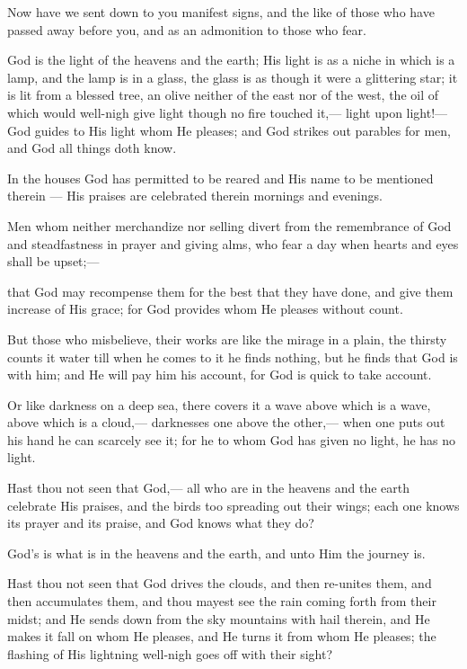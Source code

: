 \documentclass[fontsize=14pt, letterpaper, notitlepage, openany, DIV=12]{scrbook} %
\begin{document}
\noindent[24:34]
Now have we sent down to you manifest signs, and the like of those who have passed
away before you, and as an admonition to those who fear.

\noindent[24:35]
God is the light of the heavens and the earth; His light is as a niche in which is a lamp,
and the lamp is in a glass, the glass is as though it were a glittering star; it is lit from a blessed
tree, an olive neither of the east nor of the west, the oil of which would well-nigh give light
though no fire touched it,--- light upon light!--- God guides to His light whom He pleases; and
God strikes out parables for men, and God all things doth know.

\noindent[24:36]
In the houses God has permitted to be reared and His name to be mentioned therein ---
His praises are celebrated therein mornings and evenings.

\noindent[24:37]
Men whom neither merchandize nor selling divert from the remembrance of God and
steadfastness in prayer and giving alms, who fear a day when hearts and eyes shall be upset;---

\noindent[24:38]
that God may recompense them for the best that they have done, and give them increase
of His grace; for God provides whom He pleases without count.

\noindent[24:39]
But those who misbelieve, their works are like the mirage in a plain, the thirsty counts it
water till when he comes to it he finds nothing, but he finds that God is with him; and He will
pay him his account, for God is quick to take account.

\noindent[24:40]
Or like darkness on a deep sea, there covers it a wave above which is a wave, above
which is a cloud,--- darknesses one above the other,--- when one puts out his hand he can
scarcely see it; for he to whom God has given no light, he has no light.

\noindent[24:41]
Hast thou not seen that God,--- all who are in the heavens and the earth celebrate His
praises, and the birds too spreading out their wings; each one knows its prayer and its praise, and
God knows what they do?

\noindent[24:42]
God's is what is in the heavens and the earth, and unto Him the journey is.

\noindent[24:43]
Hast thou not seen that God drives the clouds, and then re-unites them, and then
accumulates them, and thou mayest see the rain coming forth from their midst; and He sends
down from the sky mountains with hail therein, and He makes it fall on whom He pleases, and
He turns it from whom He pleases; the flashing of His lightning well-nigh goes off with their
sight?
\end{document}
